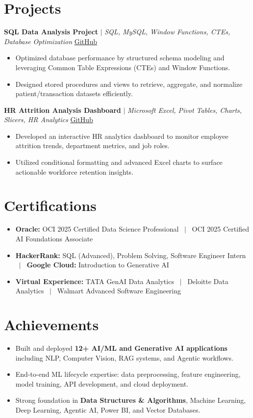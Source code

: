 \documentclass[a4paper,9pt]{article}
\newcommand{\resumeItem}[1]{\item\small #1}
\begin{document}
\vspace{-2mm}

\section{Projects}

\noindent\textbf{SQL Data Analysis Project} $|$ \textit{SQL, MySQL, Window Functions, CTEs, Database Optimization} \hfill
\href{https://github.com/hsachan295-source/smart-business-dashboard}{\small GitHub}
\begin{itemize}
\resumeItem{Optimized database performance by structured schema modeling and leveraging Common Table Expressions (CTEs) and Window Functions.}
\resumeItem{Designed stored procedures and views to retrieve, aggregate, and normalize patient/transaction datasets efficiently.}
\end{itemize}

\vspace{1.5pt}
\noindent\textbf{HR Attrition Analysis Dashboard} $|$ \textit{Microsoft Excel, Pivot Tables, Charts, Slicers, HR Analytics} \hfill
\href{https://github.com/hsachan295-source/Power-BI-Portfolio}{\small GitHub}
\begin{itemize}
\resumeItem{Developed an interactive HR analytics dashboard to monitor employee attrition trends, department metrics, and job roles.}
\resumeItem{Utilized conditional formatting and advanced Excel charts to surface actionable workforce retention insights.}
\end{itemize}


\vspace{-2mm}

\section{Certifications}
\begin{itemize}
\resumeItem{\textbf{Oracle:} OCI 2025 Certified Data Science Professional ~$|$~ OCI 2025 Certified AI Foundations Associate}
\resumeItem{\textbf{HackerRank:} SQL (Advanced), Problem Solving, Software Engineer Intern ~$|$~ \textbf{Google Cloud:} Introduction to Generative AI}
\resumeItem{\textbf{Virtual Experience:} TATA GenAI Data Analytics ~$|$~ Deloitte Data Analytics ~$|$~ Walmart Advanced Software Engineering}
\end{itemize}

\vspace{-2mm}

\section{Achievements}
\begin{itemize}
\resumeItem{Built and deployed \textbf{12+ AI/ML and Generative AI applications} including NLP, Computer Vision, RAG systems, and Agentic workflows.}
\resumeItem{End-to-end ML lifecycle expertise: data preprocessing, feature engineering, model training, API development, and cloud deployment.}
\resumeItem{Strong foundation in \textbf{Data Structures \& Algorithms}, Machine Learning, Deep Learning, Agentic AI, Power BI, and Vector Databases.}
\end{itemize}
\end{document}
